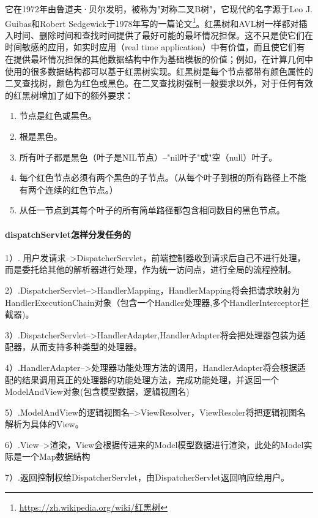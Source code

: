 \documentclass[../../../interview-questions.tex]{subfiles}
\begin{document}
它在1972年由鲁道夫·贝尔发明，被称为"对称二叉B树"，它现代的名字源于Leo J. Guibas和Robert Sedgewick于1978年写的一篇论文\footnote{\url{https://zh.wikipedia.org/wiki/红黑树}}。红黑树和AVL树一样都对插入时间、删除时间和查找时间提供了最好可能的最坏情况担保。这不只是使它们在时间敏感的应用，如实时应用（real time application）中有价值，而且使它们有在提供最坏情况担保的其他数据结构中作为基础模板的价值；例如，在计算几何中使用的很多数据结构都可以基于红黑树实现。红黑树是每个节点都带有颜色属性的二叉查找树，颜色为红色或黑色。在二叉查找树强制一般要求以外，对于任何有效的红黑树增加了如下的额外要求：

\begin{enumerate}
\item {节点是红色或黑色。}
\item{根是黑色。}
\item{所有叶子都是黑色（叶子是NIL节点）--"nil叶子"或"空（null）叶子。}
\item{每个红色节点必须有两个黑色的子节点。（从每个叶子到根的所有路径上不能有两个连续的红色节点。）}
\item{从任一节点到其每个叶子的所有简单路径都包含相同数目的黑色节点。}
\end{enumerate}

\paragraph{dispatchServlet怎样分发任务的}


1）. 用户发请求-->DispatcherServlet，前端控制器收到请求后自己不进行处理，而是委托给其他的解析器进行处理，作为统一访问点，进行全局的流程控制。

2）.DispatcherServlet-->HandlerMapping，HandlerMapping将会把请求映射为HandlerExecutionChain对象（包含一个Handler处理器,多个HandlerInterceptor拦截器)。

3）.DispatcherServlet-->HandlerAdapter,HandlerAdapter将会把处理器包装为适配器，从而支持多种类型的处理器。

4）.HandlerAdapter-->处理器功能处理方法的调用，HandlerAdapter将会根据适配的结果调用真正的处理器的功能处理方法，完成功能处理，并返回一个ModelAndView对象(包含模型数据，逻辑视图名)

5）.ModelAndView的逻辑视图名-->ViewResolver，ViewResoler将把逻辑视图名解析为具体的View。

6）.View-->渲染，View会根据传进来的Model模型数据进行渲染，此处的Model实际是一个Map数据结构

7）.返回控制权给DispatcherServlet，由DispatcherServlet返回响应给用户。
\end{document}
